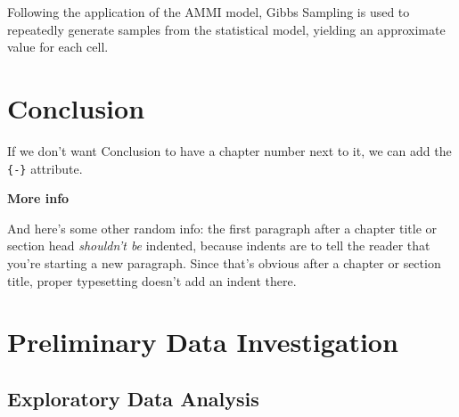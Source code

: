 \documentclass[12pt,twoside]{dukestatscithesis}
\theoremstyle{definition}
\theoremstyle{definition}
\theoremstyle{definition}
\theoremstyle{remark}
\begin{document}
Following the application of the AMMI model, Gibbs Sampling is used to
repeatedly generate samples from the statistical model, yielding an
approximate value for each cell.

\chapter*{Conclusion}\label{conclusion}

If we don't want Conclusion to have a chapter number next to it, we can
add the \texttt{\{-\}} attribute.

\textbf{More info}

And here's some other random info: the first paragraph after a chapter
title or section head \emph{shouldn't be} indented, because indents are
to tell the reader that you're starting a new paragraph. Since that's
obvious after a chapter or section title, proper typesetting doesn't add
an indent there.

\appendix

\chapter{Preliminary Data
Investigation}\label{preliminary-data-investigation}

\section{Exploratory Data Analysis}\label{exploratory-data-analysis}
\end{document}
